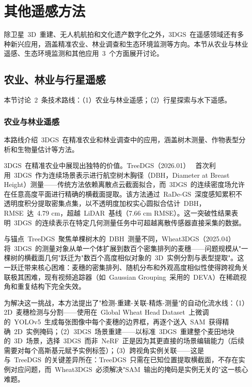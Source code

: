 

\section{其他遥感方法}
\label{sec:20_4}

除卫星~3D~重建、无人机航拍和文化遗产数字化之外，3DGS~在遥感领域还有多种新兴应用，涵盖精准农业、林业调查和生态环境监测等方向。本节从农业与林业遥感、生态环境监测和其他应用~3~个方面展开讨论。

\subsection{农业、林业与行星遥感}
\label{ss:20_5}

本节讨论~2~条技术路线：（1）农业与林业遥感；（2）行星探索与水下遥感。

\subsubsection{农业与林业遥感}

本路线介绍~3DGS~在精准农业和林业调查中的应用，涵盖树木测量、作物表型分析和生物量估计等方法。

3DGS~在精准农业中展现出独特的价值。TreeDGS（2026.01）~\cite{2601_12823} 首次利用~3DGS~作为连续场景表示进行航空树木胸径（DBH，Diameter at Breast Height）测量——传统方法依赖离散点云截面拟合，而~3DGS~的连续密度场允许在任意高度平面进行精确的横截面提取。该方法通过~RaDe-GS~深度感知累积不透明度积分提取密集点集，以不透明度加权实心圆拟合估计~DBH，RMSE~达~4.79 cm，超越~LiDAR~基线（7.66 cm RMSE）。这一突破性结果表明~3DGS~的连续表示在特定几何测量任务中可超越离散传感器直接采集的数据。

与锚点~TreeDGS~聚焦单棵树木的~DBH~测量不同，Wheat3DGS（2025.04）~\cite{2504_06978} 将~3DGS~的测量对象从单一个体扩展到数百个密集排列的麦穗——问题规模从"一棵树的横截面几何"跃迁为"数百个高度相似对象的~3D~实例分割与表型提取"。这一跃迁带来核心困难：麦穗的密集排列、随机分布和外观高度相似性使得跨视角关联极其困难，现有视频追踪器（如~Gaussian Grouping~采用的~DEVA）在稀疏视角和重复结构下完全失效。

为解决这一挑战，本方法提出了"检测-重建-关联-精炼-测量"的自动化流水线：（1）2D~麦穗检测与分割——使用在~Global Wheat Head Dataset~上微调的~YOLOv5~生成每张图像中每个麦穗的边界框，再逐个送入~SAM~获得精确~2D~实例掩码；（2）3DGS~场景重建——以标准~3DGS~重建整个麦田地块的~3D~场景，选择~3DGS~而非~NeRF~正是因为其更直接的场景编辑能力（后续需要对每个高斯基元赋予实例标签）；（3）跨视角实例关联——这是与~TreeDGS~的关键差异所在：TreeDGS~只需在已知位置提取横截面，不存在实例对应问题，而~Wheat3DGS~必须解决"SAM~输出的掩码是实例无关的"这一核心难题。

